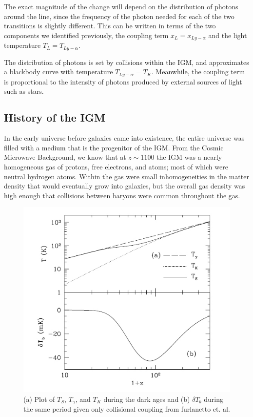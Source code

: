 The exact magnitude of the change will depend on the distribution of photons around the \lya line, since the frequency of the photon needed for each of the two transitions is slightly different. This can be written in terms of the two components we identified previously, the coupling term $x_{L} = x_{Ly-\alpha}$ and the light temperature $T_L = T_{Ly-\alpha}$. 

The distribution of \lya photons is set by collisions within the IGM, and approximates a blackbody curve with temperature $T_{Ly-\alpha} = T_K$. Meanwhile, the \lya coupling term is proportional to the intensity of \lya photons produced by external sources of light such as stars. 

\subsection{History of the IGM}
In the early universe before galaxies came into existence, the entire universe was filled with a medium that is the progenitor of the IGM. From the Cosmic Microwave Background, we know that at $z \sim 1100$ the IGM was a nearly homogeneous gas of protons, free electrons, and atoms; most of which were neutral hydrogen atoms. Within the gas were small inhomogeneities in the matter density that would eventually grow into galaxies, but the overall gas density was high enough that collisions between baryons were common throughout the gas. 

\begin{figure}[htb]
\begin{center}
\includegraphics[width=0.95\linewidth]{Introduction/figures/dark_ages_global_spectrum.jpg}
\caption{(a) Plot of $T_S$, $T_\gamma$, and $T_K$ during the dark ages and (b) $\delta T_b$ during the same period given only collisional coupling from furlanetto et. al. \cite{furlanetto_2006}}
\label{Fig:da_global}
\end{center}
\end{figure}

